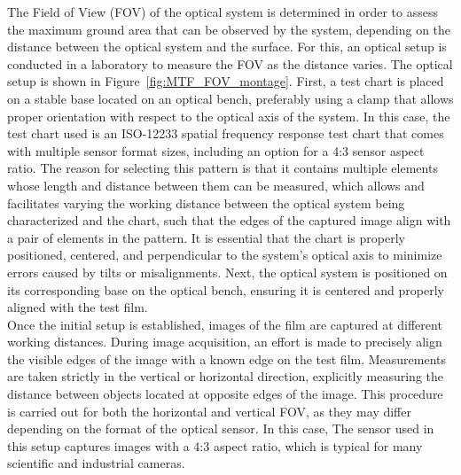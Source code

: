 \noindent The Field of View (FOV) of the optical system is determined in order to assess the maximum ground area that can be observed by the system, depending on the distance between the optical system and the surface. For this, an optical setup is conducted in a laboratory to measure the FOV as the distance varies. The optical setup is shown in Figure~\ref{fig:MTF_FOV_montage}. First, a test chart is placed on a stable base located on an optical bench, preferably using a clamp that allows proper orientation with respect to the optical axis of the system. In this case, the test chart used is an ISO-12233 spatial frequency response test chart that comes with multiple sensor format sizes, including an option for a 4:3 sensor aspect ratio. The reason for selecting this pattern is that it contains multiple elements whose length and distance between them can be measured, which allows and facilitates varying the working distance between the optical system being characterized and the chart, such that the edges of the captured image align with a pair of elements in the pattern. It is essential that the chart is properly positioned, centered, and perpendicular to the system's optical axis to minimize errors caused by tilts or misalignments. Next, the optical system is positioned on its corresponding base on the optical bench, ensuring it is centered and properly aligned with the test film.\\ 

\noindent Once the initial setup is established, images of the film are captured at different working distances. During image acquisition, an effort is made to precisely align the visible edges of the image with a known edge on the test film. Measurements are taken strictly in the vertical or horizontal direction, explicitly measuring the distance between objects located at opposite edges of the image. This procedure is carried out for both the horizontal and vertical FOV, as they may differ depending on the format of the optical sensor. In this case, The sensor used in this setup captures images with a 4:3 aspect ratio, which is typical for many scientific and industrial cameras. 


